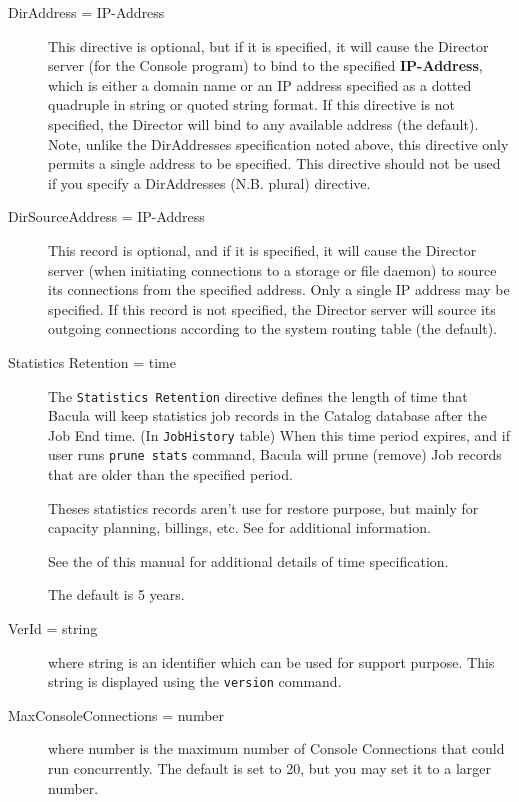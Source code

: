\begin{description}
\item [DirAddress = \lt{}IP-Address\gt{}]
   This directive is optional, but if it is specified, it will cause the
   Director server (for the Console program) to bind to the specified {\bf
     IP-Address}, which is either a domain name or an IP address specified as a
   dotted quadruple in string or quoted string format.  If this directive is
   not specified, the Director will bind to any available address (the
   default).  Note, unlike the DirAddresses specification noted above, this
   directive only permits a single address to be specified.  This directive
   should not be used if you specify a DirAddresses (N.B. plural) directive.

\item [DirSourceAddress = \lt{}IP-Address\gt{}]
   This record is optional, and if it is specified, it will cause the Director
   server (when initiating connections to a storage or file daemon) to source
   its connections from the specified address.  Only a single IP address may be
   specified.  If this record is not specified, the Director server will source
   its outgoing connections according to the system routing table (the default).

\item[Statistics Retention = \lt{}time\gt{}]
   \label{PruneStatistics}

   The \texttt{Statistics Retention} directive defines the length of time that
   Bacula will keep statistics job records in the Catalog database after the
   Job End time. (In \texttt{JobHistory} table) When this time period expires,
   and if user runs \texttt{prune stats} command, Bacula will prune (remove)
   Job records that are older than the specified period.

   Theses statistics records aren't use for restore purpose, but mainly for
   capacity planning, billings, etc. See  for
   additional information.

   See the  of this manual for additional
   details of time specification.

   The default is 5 years.

\item[VerId = \lt{}string\gt{}]
  where  \lt{}string\gt{} is an identifier which can be used for support purpose.
  This string is displayed using the \texttt{version} command.

\item[MaxConsoleConnections = \lt{}number\gt{}] 
   where \lt{}number\gt{}  is the maximum number of Console Connections that
   could run  concurrently. The default is set to 20, but you may set it to a 
   larger number.

\end{description}


